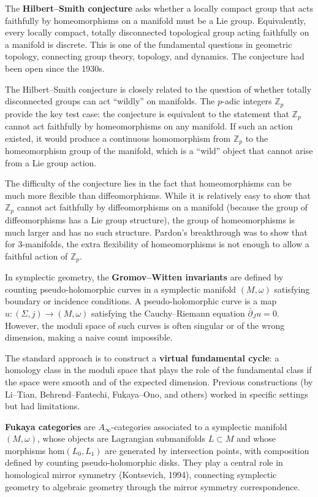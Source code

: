The \textbf{Hilbert--Smith conjecture} asks whether a locally compact group that acts faithfully by homeomorphisms on a manifold must be a Lie group. Equivalently, every locally compact, totally disconnected topological group acting faithfully on a manifold is discrete. This is one of the fundamental questions in geometric topology, connecting group theory, topology, and dynamics. The conjecture had been open since the 1930s.

The Hilbert--Smith conjecture is closely related to the question of whether totally disconnected groups can act ``wildly'' on manifolds. The $p$-adic integers $\mathbb{Z}_p$ provide the key test case: the conjecture is equivalent to the statement that $\mathbb{Z}_p$ cannot act faithfully by homeomorphisms on any manifold. If such an action existed, it would produce a continuous homomorphism from $\mathbb{Z}_p$ to the homeomorphism group of the manifold, which is a ``wild'' object that cannot arise from a Lie group action.

The difficulty of the conjecture lies in the fact that homeomorphisms can be much more flexible than diffeomorphisms. While it is relatively easy to show that $\mathbb{Z}_p$ cannot act faithfully by diffeomorphisms on a manifold (because the group of diffeomorphisms has a Lie group structure), the group of homeomorphisms is much larger and has no such structure. Pardon's breakthrough was to show that for 3-manifolds, the extra flexibility of homeomorphisms is not enough to allow a faithful action of $\mathbb{Z}_p$.

In symplectic geometry, the \textbf{Gromov--Witten invariants} are defined by counting pseudo-holomorphic curves in a symplectic manifold $(M,\omega)$ satisfying boundary or incidence conditions. A pseudo-holomorphic curve is a map $u:(\Sigma,j)\to(M,\omega)$ satisfying the Cauchy--Riemann equation $\bar{\partial}_J u = 0$. However, the moduli space of such curves is often singular or of the wrong dimension, making a naive count impossible.

The standard approach is to construct a \textbf{virtual fundamental cycle}: a homology class in the moduli space that plays the role of the fundamental class if the space were smooth and of the expected dimension. Previous constructions (by Li--Tian, Behrend--Fantechi, Fukaya--Ono, and others) worked in specific settings but had limitations.

\textbf{Fukaya categories} are $A_\infty$-categories associated to a symplectic manifold $(M,\omega)$, whose objects are Lagrangian submanifolds $L \subset M$ and whose morphisms $\mathrm{hom}(L_0,L_1)$ are generated by intersection points, with composition defined by counting pseudo-holomorphic disks. They play a central role in homological mirror symmetry (Kontsevich, 1994), connecting symplectic geometry to algebraic geometry through the mirror symmetry correspondence.

